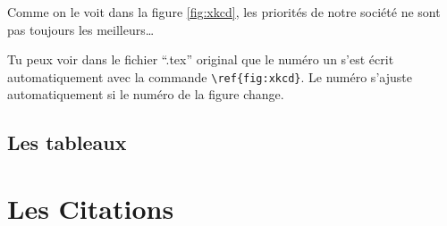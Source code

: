 \documentclass[a4paper, 10pt]{article}
\begin{document}
\begin{center}
Comme on le voit dans la figure \ref{fig:xkcd}, les priorités de notre société
ne sont pas toujours les meilleurs\ldots
\end{center}

Tu peux voir dans le fichier ``.tex'' original que le numéro un s'est écrit
automatiquement avec la commande \verb+\ref{fig:xkcd}+. Le numéro s'ajuste
automatiquement si le numéro de la figure change.

\subsection{Les tableaux}

\section{Les Citations}
\end{document}
